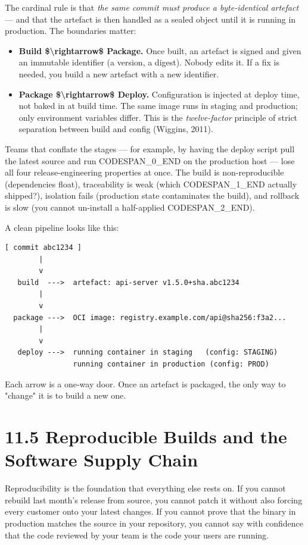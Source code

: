\documentclass[11pt,a4paper]{book}
\begin{document}
The cardinal rule is that \textit{the same commit must produce a byte-identical artefact} --- and that the artefact is then handled as a sealed object until it is running in production. The boundaries matter:

\begin{itemize}
  \item \textbf{Build \$\textbackslash{}rightarrow\$ Package.} Once built, an artefact is signed and given an immutable identifier (a version, a digest). Nobody edits it. If a fix is needed, you build a new artefact with a new identifier.
  \item \textbf{Package \$\textbackslash{}rightarrow\$ Deploy.} Configuration is injected at deploy time, not baked in at build time. The same image runs in staging and production; only environment variables differ. This is the \textit{twelve-factor} principle of strict separation between build and config (Wiggins, 2011).
\end{itemize}

Teams that conflate the stages --- for example, by having the deploy script pull the latest source and run CODESPAN\_0\_END on the production host --- lose all four release-engineering properties at once. The build is non-reproducible (dependencies float), traceability is weak (which CODESPAN\_1\_END actually shipped?), isolation fails (production state contaminates the build), and rollback is slow (you cannot un-install a half-applied CODESPAN\_2\_END).

A clean pipeline looks like this:

\begin{lstlisting}
[ commit abc1234 ]
        |
        v
   build  --->  artefact: api-server v1.5.0+sha.abc1234
        |
        v
  package --->  OCI image: registry.example.com/api@sha256:f3a2...
        |
        v
   deploy --->  running container in staging   (config: STAGING)
                running container in production (config: PROD)
\end{lstlisting}

Each arrow is a one-way door. Once an artefact is packaged, the only way to "change" it is to build a new one.

\medskip

\section{11.5 Reproducible Builds and the Software Supply Chain}

Reproducibility is the foundation that everything else rests on. If you cannot rebuild last month's release from source, you cannot patch it without also forcing every customer onto your latest changes. If you cannot prove that the binary in production matches the source in your repository, you cannot say with confidence that the code reviewed by your team is the code your users are running.
\end{document}
